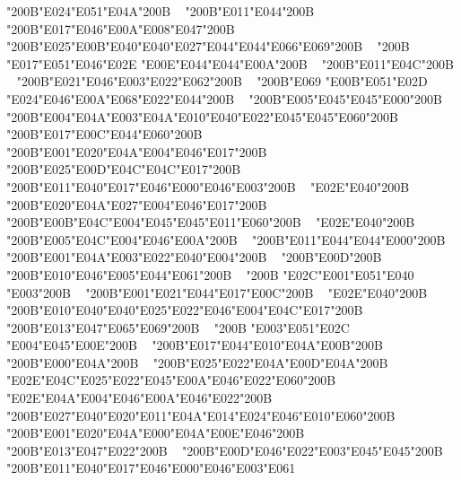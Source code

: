 \documentclass[12pt]{article}
\newcommand{\overlaychars}[3]{%
  \hbox{#1\kern#2#3}%
}
\begin{document}
\char"200B{\color{red}\char"E024\char"E051\char"E04A}\char"200B \mbox{ } \char"200B\char"E011\char"E044\char"200B \mbox{ } \char"200B\char"E017\char"E046\char"E00A\char"E008\char"E047\char"200B \mbox{ } \char"200B\char"E025\char"E00B\char"E040\char"E040\char"E027\char"E044\char"E044\char"E066\char"E069\char"200B \mbox{ } \char"200B{\color{red}\overlaychars{\char"E017\char"E051\char"E046}{-2pt}{\char"E02E}}\char"E00E\char"E044\char"E044\char"E00A\char"200B \mbox{ } \char"200B\char"E011\char"E04C\char"200B \mbox{ } \char"200B\char"E021\char"E046\char"E003\char"E022\char"E062\char"200B \mbox{ } \char"200B\char"E069{\color{red}\overlaychars{\char"E00B\char"E051}{-2pt}{\char"E02D}}\char"E024\char"E046\char"E00A\char"E068\char"E022\char"E044\char"200B \mbox{ } \char"200B\char"E005\char"E045\char"E045\char"E000\char"200B \mbox{ } \char"200B\char"E004\char"E04A\char"E003\char"E04A\char"E010\char"E040\char"E022\char"E045\char"E045\char"E060\char"200B \mbox{ } \char"200B\char"E017\char"E00C\char"E044\char"E060\char"200B \mbox{ } \char"200B\char"E001\char"E020\char"E04A\char"E004\char"E046\char"E017\char"200B \mbox{ } \char"200B\char"E025\char"E00D\char"E04C\char"E04C\char"E017\char"200B \mbox{ } \char"200B\char"E011\char"E040\char"E017\char"E046\char"E000\char"E046\char"E003\char"200B \mbox{ } \char"E02E\char"E040\char"200B \mbox{ } \char"200B\char"E020\char"E04A\char"E027\char"E004\char"E046\char"E017\char"200B \mbox{ } \char"200B\char"E00B\char"E04C\char"E004\char"E045\char"E045\char"E011\char"E060\char"200B \mbox{ } \char"E02E\char"E040\char"200B \mbox{ } \char"200B\char"E005\char"E04C\char"E004\char"E046\char"E00A\char"200B \mbox{ } \char"200B\char"E011\char"E044\char"E044\char"E000\char"200B \mbox{ } \char"200B\char"E001\char"E04A\char"E003\char"E022\char"E040\char"E004\char"200B \mbox{ } \char"200B\char"E00D\char"200B \mbox{ } \char"200B\char"E010\char"E046\char"E005\char"E044\char"E061\char"200B \mbox{ } \char"200B{\color{red}\overlaychars{\char"E02C}{-2pt}{\char"E001\char"E051\char"E040}}\char"E003\char"200B \mbox{ } \char"200B\char"E001\char"E021\char"E044\char"E017\char"E00C\char"200B \mbox{ } \char"E02E\char"E040\char"200B \mbox{ } \char"200B\char"E010\char"E040\char"E040\char"E025\char"E022\char"E046\char"E004\char"E04C\char"E017\char"200B \mbox{ } \char"200B\char"E013\char"E047\char"E065\char"E069\char"200B \mbox{ } \char"200B{\color{red}\overlaychars{\char"E003\char"E051}{-2pt}{\char"E02C}}\char"E004\char"E045\char"E00E\char"200B \mbox{ } \char"200B\char"E017\char"E044\char"E010\char"E04A\char"E00B\char"200B \mbox{ } \char"200B\char"E000\char"E04A\char"200B \mbox{ } \char"200B\char"E025\char"E022\char"E04A\char"E00D\char"E04A\char"200B \mbox{ } \char"E02E\char"E04C\char"E025\char"E022\char"E045\char"E00A\char"E046\char"E022\char"E060\char"200B \mbox{ } \char"E02E\char"E04A\char"E004\char"E046\char"E00A\char"E046\char"E022\char"200B \mbox{ } \char"200B\char"E027\char"E040\char"E020\char"E011\char"E04A\char"E014\char"E024\char"E046\char"E010\char"E060\char"200B \mbox{ } \char"200B\char"E001\char"E020\char"E04A\char"E000\char"E04A\char"E00E\char"E046\char"200B \mbox{ } \char"200B\char"E013\char"E047\char"E022\char"200B \mbox{ } \char"200B\char"E00D\char"E046\char"E022\char"E003\char"E045\char"E045\char"200B \mbox{ } \char"200B\char"E011\char"E040\char"E017\char"E046\char"E000\char"E046\char"E003\char"E061
\end{document}
